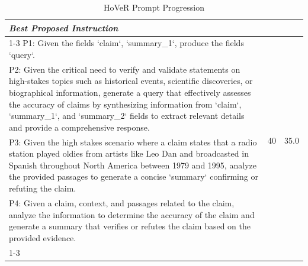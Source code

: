 \begin{table}[ht]
\begin{tabularx}{\textwidth}{Xcc}
\textit{Best Proposed Instruction} \\
\cline{1-3}
P1: Given the fields `claim`, `summary\_1`, produce the fields `query`. & \multirow{4}{*}{40} & \multirow{4}{*}{35.0} \\
P2: Given the critical need to verify and validate statements on high-stakes topics such as historical events, scientific discoveries, or biographical information, generate a query that effectively assesses the accuracy of claims by synthesizing information from `claim`, `summary\_1`, and `summary\_2` fields to extract relevant details and provide a comprehensive response. & & \\
P3: Given the high stakes scenario where a claim states that a radio station played oldies from artists like Leo Dan and broadcasted in Spanish throughout North America between 1979 and 1995, analyze the provided passages to generate a concise `summary` confirming or refuting the claim. & & \\
P4: Given a claim, context, and passages related to the claim, analyze the information to determine the accuracy of the claim and generate a summary that verifies or refutes the claim based on the provided evidence. & & \\
\cline{1-3}

\hline
\end{tabularx}
\caption{HoVeR Prompt Progression}
\label{table:HoVeR_prompt_progression}
\end{table}

